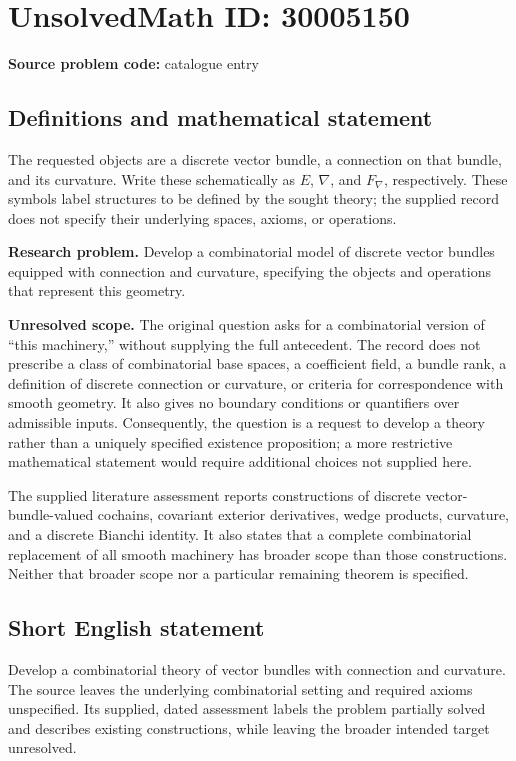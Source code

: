 \documentclass[11pt]{article}
\begin{document}
\section*{UnsolvedMath ID: 30005150}
\textbf{Source problem code:} catalogue entry
\subsection{Definitions and mathematical statement}
The requested objects are a discrete vector bundle, a connection on that bundle, and its curvature. Write these schematically as \(E\), \(\nabla\), and \(F_{\nabla}\), respectively. These symbols label structures to be defined by the sought theory; the supplied record does not specify their underlying spaces, axioms, or operations.

\textbf{Research problem.} Develop a combinatorial model of discrete vector bundles equipped with connection and curvature, specifying the objects and operations that represent this geometry.

\textbf{Unresolved scope.} The original question asks for a combinatorial version of ``this machinery,'' without supplying the full antecedent. The record does not prescribe a class of combinatorial base spaces, a coefficient field, a bundle rank, a definition of discrete connection or curvature, or criteria for correspondence with smooth geometry. It also gives no boundary conditions or quantifiers over admissible inputs. Consequently, the question is a request to develop a theory rather than a uniquely specified existence proposition; a more restrictive mathematical statement would require additional choices not supplied here.

The supplied literature assessment reports constructions of discrete vector-bundle-valued cochains, covariant exterior derivatives, wedge products, curvature, and a discrete Bianchi identity. It also states that a complete combinatorial replacement of all smooth machinery has broader scope than those constructions. Neither that broader scope nor a particular remaining theorem is specified.
\subsection{Short English statement}
Develop a combinatorial theory of vector bundles with connection and curvature. The source leaves the underlying combinatorial setting and required axioms unspecified. Its supplied, dated assessment labels the problem partially solved and describes existing constructions, while leaving the broader intended target unresolved.
\end{document}
